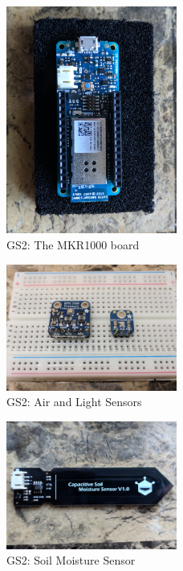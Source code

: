 \documentclass[IEEEtran,letterpaper,10pt,titlepage,fleqn,draftclsnofoot,onecolumn]{article}
\begin{document}
\begin{figure}[H]
  \caption{GS2: The MKR1000 board}
  \centering
  \includegraphics[width=0.5\textwidth]{MKR1000}
\end{figure}

\begin{figure}[H]
  \caption{GS2: Air and Light Sensors}
  \centering
  \includegraphics[width=0.5\textwidth]{air_light_sensors}
\end{figure}

\begin{figure}[H]
  \caption{GS2: Soil Moisture Sensor}
  \centering
  \includegraphics[width=0.5\textwidth]{soil_sensor}
\end{figure}
\end{document}
